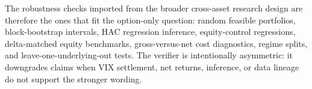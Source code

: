 The robustness checks imported from the broader cross-asset research design are therefore
the ones that fit the option-only question: random feasible portfolios, block-bootstrap
intervals, HAC regression inference, equity-control regressions, delta-matched equity
benchmarks, gross-versus-net cost diagnostics, regime splits, and leave-one-underlying-out
tests. The verifier is intentionally asymmetric: it downgrades claims when VIX settlement,
net returns, inference, or data lineage do not support the stronger wording.
